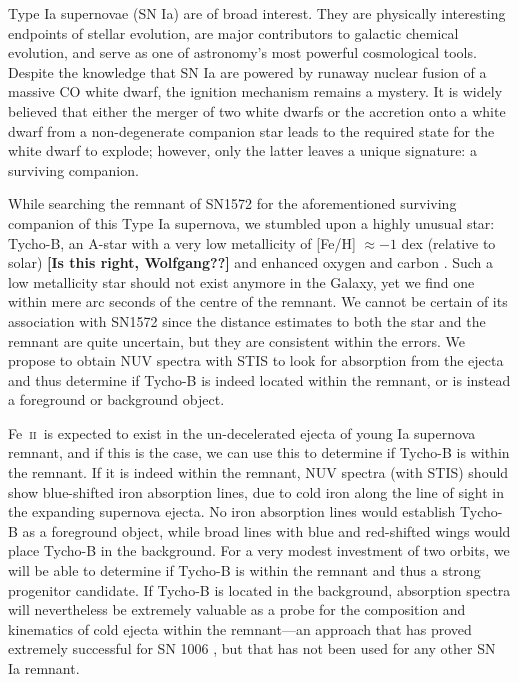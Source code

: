 \documentclass[12pt]{article}
\newcommand{\feii}{Fe~\textsc{ii}}
\begin{document}
%
%
\justification

Type Ia supernovae (SN Ia) are of broad interest. They are physically interesting endpoints of stellar evolution, are major contributors to galactic chemical evolution, and serve as one of astronomy's most powerful cosmological tools. 
Despite the knowledge that SN Ia are powered by runaway nuclear fusion of a massive CO white dwarf, the ignition mechanism remains a mystery. It is widely believed that either the merger of two white dwarfs or the accretion onto a white dwarf from a non-degenerate companion star leads to the required state for the white dwarf to explode; however, only the latter leaves a unique signature: a surviving companion.

While searching the remnant of SN1572 for the aforementioned surviving companion of this Type Ia supernova,  we stumbled upon a highly unusual star: Tycho-B, an A-star with a very low metallicity of [Fe/H] $\approx -1$ dex (relative to solar) {\bf[Is this right, Wolfgang??]}  and enhanced oxygen and carbon \citep{2012arXiv1210.2713K}. Such a low metallicity star should not exist anymore in the Galaxy, yet we find one within mere arc seconds of the centre of the remnant. We cannot be certain of its association with SN1572 since the distance estimates to both the star and the remnant are quite uncertain, but they are consistent within the errors.   We propose to obtain NUV spectra with STIS  to look for absorption from the ejecta and thus determine if Tycho-B is indeed located within the remnant,  or is instead a foreground or background object.

\feii\ is expected to exist in the un-decelerated ejecta of young Ia supernova remnant, and if this is the case, we can use this  to determine if Tycho-B is within the remnant.
If it is indeed within the remnant, NUV spectra (with STIS) should show blue-shifted iron absorption lines, due to cold iron along the line of sight in the  expanding supernova ejecta. No iron absorption lines would establish Tycho-B as a foreground object, while broad lines with blue and red-shifted wings would place Tycho-B in the background. For a very modest investment of two orbits, we will be able to determine if Tycho-B is within the remnant and thus a strong progenitor candidate. If Tycho-B is located in the background, absorption spectra will nevertheless be extremely valuable as a probe for the composition and kinematics of cold ejecta within the remnant---an approach that has proved extremely successful for SN 1006 \citep[e.g.][]{1988ApJ...327..164F,1993ApJ...416..247W,2005ApJ...624..189W}, but that has not been used for any other SN Ia remnant.
\end{document}
